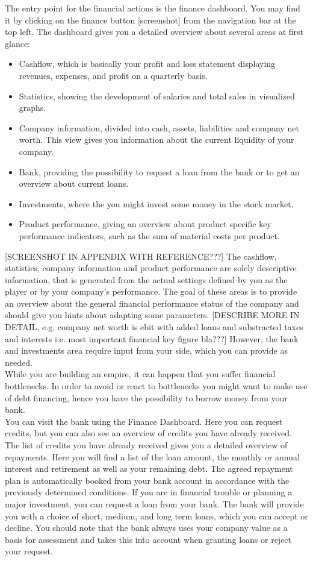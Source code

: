  The entry point for the financial actions is the finance dashboard. You may find it by clicking on the finance button [screenshot] from the navigation bar at the top left. The dashboard gives you a detailed overview about several areas at first glance:
\begin{itemize}
    \item Cashflow, which is basically your profit and loss statement displaying revenues, expenses, and profit on a quarterly basis.
    \item Statistics, showing the development of salaries and total sales in visualized graphs.
    \item Company information, divided into cash, assets, liabilities and company net worth. This view gives you information about the current liquidity of your company.
    \item Bank, providing the possibility to request a loan from the bank or to get an overview about current loans.
    \item Investments, where the you might invest some money in the stock market.
    \item Product performance, giving an overview about product specific key performance indicators, such as the sum of material costs per product.
\end{itemize}
[SCREENSHOT IN APPENDIX WITH REFERENCE???] The cashflow, statistics, company information and product performance are solely descriptive information, that is generated from the actual settings defined by you as the player or by your company’s performance. The goal of these areas is to provide an overview about the general financial performance status of the company and should give you hints about adapting some parameters. [DESCRIBE MORE IN DETAIL, e.g. company net worth is ebit with added loans and substracted taxes and interests i.e. most important financial key figure bla???] However, the bank and investments area require input from your side, which you can provide as needed. \\

While you are building an empire, it can happen that you suffer financial bottlenecks. In order to avoid or react to bottlenecks you might want to make use of debt financing, hence you have the possibility to borrow money from your bank. \\

You can visit the bank using the Finance Dashboard. Here you can request credits, but you can also see an overview of credits you have already received.
The list of credits you have already received gives you a detailed overview of repayments. Here you will find a list of the loan amount, the monthly or annual interest and retirement as well as your remaining debt. The agreed repayment plan is automatically booked from your bank account in accordance with the previously determined conditions.
If you are in financial trouble or planning a major investment, you can request a loan from your bank. The bank will provide you with a choice of short, medium, and long term loans, which you can accept or decline. You should note that the bank always uses your company value as a basis for assessment and takes this into account when granting loans or reject your request. 

